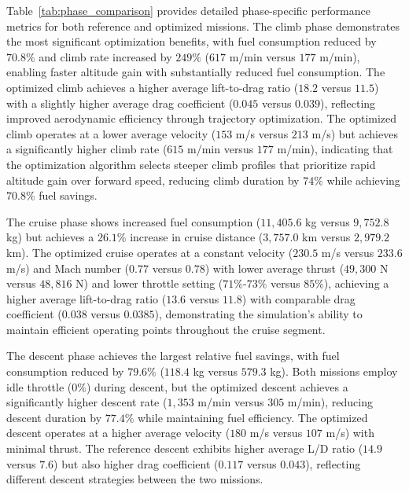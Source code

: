 Table~\ref{tab:phase_comparison} provides detailed phase-specific performance metrics for both reference and optimized missions. The climb phase demonstrates the most significant optimization benefits, with fuel consumption reduced by $70.8\%$ and climb rate increased by $249\%$ ($617$ m/min versus $177$ m/min), enabling faster altitude gain with substantially reduced fuel consumption. The optimized climb achieves a higher average lift-to-drag ratio ($18.2$ versus $11.5$) with a slightly higher average drag coefficient ($0.045$ versus $0.039$), reflecting improved aerodynamic efficiency through trajectory optimization. The optimized climb operates at a lower average velocity ($153$ m/s versus $213$ m/s) but achieves a significantly higher climb rate ($615$ m/min versus $177$ m/min), indicating that the optimization algorithm selects steeper climb profiles that prioritize rapid altitude gain over forward speed, reducing climb duration by $74\%$ while achieving $70.8\%$ fuel savings.

The cruise phase shows increased fuel consumption ($11,405.6$ kg versus $9,752.8$ kg) but achieves a $26.1\%$ increase in cruise distance ($3,757.0$ km versus $2,979.2$ km). The optimized cruise operates at a constant velocity ($230.5$ m/s versus $233.6$ m/s) and Mach number ($0.77$ versus $0.78$) with lower average thrust ($49,300$ N versus $48,816$ N) and lower throttle setting ($71\%$-$73\%$ versus $85\%$), achieving a higher average lift-to-drag ratio ($13.6$ versus $11.8$) with comparable drag coefficient ($0.038$ versus $0.0385$), demonstrating the simulation's ability to maintain efficient operating points throughout the cruise segment.

The descent phase achieves the largest relative fuel savings, with fuel consumption reduced by $79.6\%$ ($118.4$ kg versus $579.3$ kg). Both missions employ idle throttle ($0\%$) during descent, but the optimized descent achieves a significantly higher descent rate ($1,353$ m/min versus $305$ m/min), reducing descent duration by $77.4\%$ while maintaining fuel efficiency. The optimized descent operates at a higher average velocity ($180$ m/s versus $107$ m/s) with minimal thrust. The reference descent exhibits higher average L/D ratio ($14.9$ versus $7.6$) but also higher drag coefficient ($0.117$ versus $0.043$), reflecting different descent strategies between the two missions.

